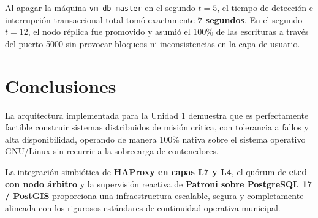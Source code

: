 \documentclass[12pt]{article}
\begin{document}
Al apagar la máquina \texttt{vm-db-master} en el segundo $t=5$, el tiempo de detección e interrupción transaccional total tomó exactamente \textbf{7 segundos}. En el segundo $t=12$, el nodo réplica fue promovido y asumió el 100\% de las escrituras a través del puerto 5000 sin provocar bloqueos ni inconsistencias en la capa de usuario.


\section{Conclusiones}

La arquitectura implementada para la Unidad 1 demuestra que es perfectamente factible construir sistemas distribuidos de misión crítica, con tolerancia a fallos y alta disponibilidad, operando de manera 100\% nativa sobre el sistema operativo GNU/Linux sin recurrir a la sobrecarga de contenedores. 

La integración simbiótica de \textbf{HAProxy en capas L7 y L4}, el quórum de \textbf{etcd con nodo árbitro} y la supervisión reactiva de \textbf{Patroni sobre PostgreSQL 17 / PostGIS} proporciona una infraestructura escalable, segura y completamente alineada con los rigurosos estándares de continuidad operativa municipal.
\end{document}

